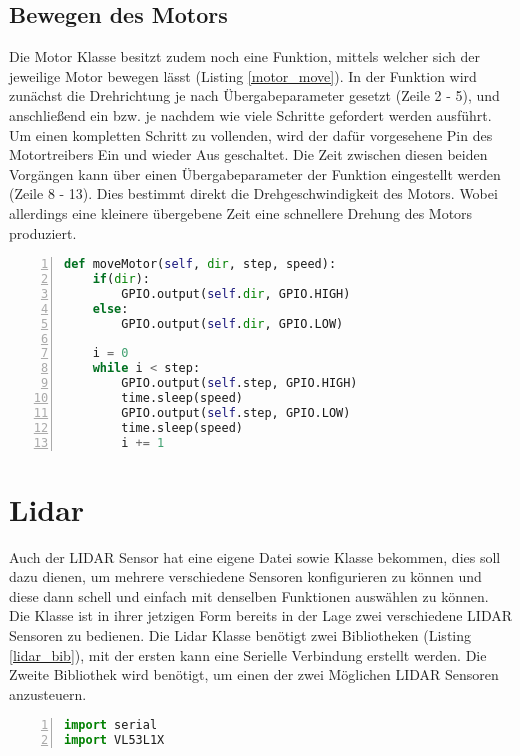 \subsection{Bewegen des Motors}
Die Motor Klasse besitzt zudem noch eine Funktion, mittels welcher sich der jeweilige Motor bewegen lässt (Listing \ref{motor_move}). In der Funktion wird zunächst die Drehrichtung je nach Übergabeparameter gesetzt (Zeile 2 - 5), und anschließend ein bzw. je nachdem wie viele Schritte gefordert werden ausführt. Um einen kompletten Schritt zu vollenden, wird der dafür vorgesehene Pin des Motortreibers Ein und wieder Aus geschaltet. Die Zeit zwischen diesen beiden Vorgängen kann über einen Übergabeparameter der Funktion eingestellt werden (Zeile 8 - 13). Dies bestimmt direkt die Drehgeschwindigkeit des Motors. Wobei allerdings eine kleinere übergebene Zeit eine schnellere Drehung des Motors produziert. 
\begin{lstlisting}[caption={Funktion zum Bewegen des Motors}, language={Python}, label={motor_move}, numbers=left]
def moveMotor(self, dir, step, speed):
    if(dir):
        GPIO.output(self.dir, GPIO.HIGH)
    else:
        GPIO.output(self.dir, GPIO.LOW)

    i = 0
    while i < step:
        GPIO.output(self.step, GPIO.HIGH)
        time.sleep(speed)
        GPIO.output(self.step, GPIO.LOW)
        time.sleep(speed)
        i += 1
\end{lstlisting}


\section{Lidar}
Auch der \ac{LIDAR} Sensor hat eine eigene Datei sowie Klasse bekommen, dies soll dazu dienen, um mehrere verschiedene Sensoren konfigurieren zu können und diese dann schell und einfach mit denselben Funktionen auswählen zu können.\\
Die Klasse ist in ihrer jetzigen Form bereits in der Lage zwei verschiedene \ac{LIDAR} Sensoren zu bedienen.
Die Lidar Klasse benötigt zwei Bibliotheken (Listing \ref{lidar_bib}), mit der ersten kann eine Serielle Verbindung erstellt werden. Die Zweite Bibliothek wird benötigt, um einen der zwei Möglichen \ac{LIDAR} Sensoren anzusteuern. 
\begin{lstlisting}[caption={Bibliotheken der Lidar Klasse}, language={Python}, label={lidar_bib}, numbers=left]
import serial
import VL53L1X
\end{lstlisting}

